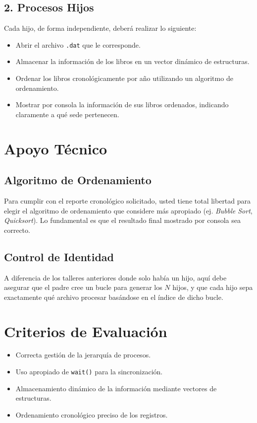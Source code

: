 \documentclass[12pt,a4paper]{article}
\begin{document}
\subsection*{2. Procesos Hijos}
Cada hijo, de forma independiente, deberá realizar lo siguiente:
\begin{itemize}
    \item Abrir el archivo \texttt{.dat} que le corresponde.
    \item Almacenar la información de los libros en un vector dinámico de estructuras.
    \item Ordenar los libros cronológicamente por año utilizando un algoritmo de ordenamiento.
    \item Mostrar por consola la información de sus libros ordenados, indicando claramente a qué sede pertenecen.
\end{itemize}

\section*{Apoyo Técnico}

\subsection*{Algoritmo de Ordenamiento}
Para cumplir con el reporte cronológico solicitado, usted tiene total libertad para elegir el algoritmo de ordenamiento que considere más apropiado (ej. \textit{Bubble Sort}, \textit{Quicksort}). Lo fundamental es que el resultado final mostrado por consola sea correcto.

\subsection*{Control de Identidad}
A diferencia de los talleres anteriores donde solo había un hijo, aquí debe asegurar que el padre cree un bucle para generar los $N$ hijos, y que cada hijo sepa exactamente qué archivo procesar basándose en el índice de dicho bucle.

\section*{Criterios de Evaluación}
\begin{itemize}
    \item Correcta gestión de la jerarquía de procesos.
    \item Uso apropiado de \texttt{wait()} para la sincronización.
    \item Almacenamiento dinámico de la información mediante vectores de estructuras.
    \item Ordenamiento cronológico preciso de los registros.
\end{itemize}
\end{document}

